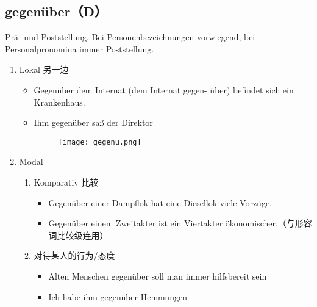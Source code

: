 \documentclass[UTF8]{report}
\begin{document}
\subsection{gegenüber（D）}
Prä- und Poststellung. Bei Personenbezeichnungen vorwiegend, bei Personalpronomina immer Poststellung.
\begin{enumerate}
    \item Lokal 另一边
    \begin{itemize}
        \item Gegenüber dem Internat (dem Internat gegen- über) befindet sich ein Krankenhaus.
        \item Ihm gegenüber saß der Direktor
        \begin{figure}[H]
            \centering
            \texttt{[image: gegenu.png]}
        \end{figure}
    \end{itemize}
    \item Modal
    \begin{enumerate}
        \item Komparativ 比较
        \begin{itemize}
            \item Gegenüber einer Dampflok hat eine Diesellok viele Vorzüge.
            \item Gegenüber einem Zweitakter ist ein Viertakter ökonomischer.（与形容词比较级连用）
        \end{itemize}
        \item 对待某人的行为/态度
        \begin{itemize}
            \item Alten Menschen gegenüber soll man immer hilfsbereit sein
            \item Ich habe ihm gegenüber Hemmungen
        \end{itemize}
    \end{enumerate}
\end{enumerate}
\end{document}
